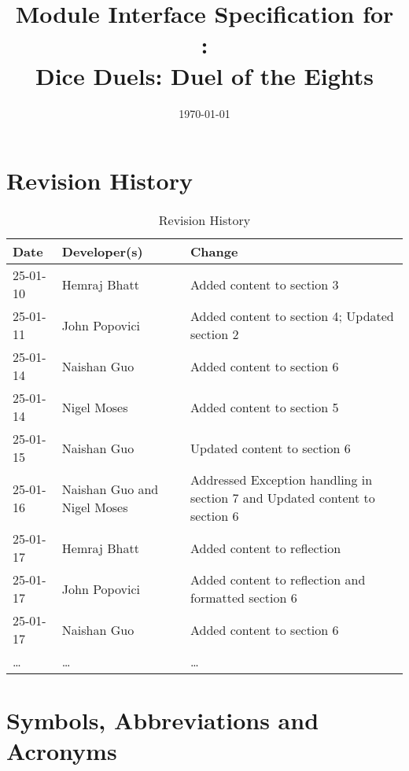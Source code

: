 \documentclass[12pt, titlepage]{article}
\begin{document}
\title{Module Interface Specification for\\\progname:\\Dice Duels: Duel of the Eights}

\author{\authname}

\date{\today}

\maketitle


\section{Revision History}

\begin{table}[hp]
\caption{Revision History} \label{TblRevisionHistory}
\begin{tabularx}{\textwidth}{llX}
\toprule
\textbf{Date} & \textbf{Developer(s)} & \textbf{Change}\\
\midrule
25-01-10 & Hemraj Bhatt & Added content to section 3\\
25-01-11 & John Popovici & Added content to section 4; Updated section 2\\
25-01-14 & Naishan Guo & Added content to section 6\\
25-01-14 & Nigel Moses & Added content to section 5\\
25-01-15 & Naishan Guo & Updated content to section 6\\
25-01-16 & Naishan Guo and Nigel Moses &  Addressed Exception handling in section 7 and Updated content to section 6 \\
25-01-17 & Hemraj Bhatt & Added content to reflection\\
25-01-17 & John Popovici & Added content to reflection and formatted section 6\\
25-01-17 & Naishan Guo & Added content to section 6\\
\dots & \dots & \dots\\
\bottomrule
\end{tabularx}
\end{table}


\newpage

\tableofcontents

\newpage


\section{Symbols, Abbreviations and Acronyms}
\end{document}
